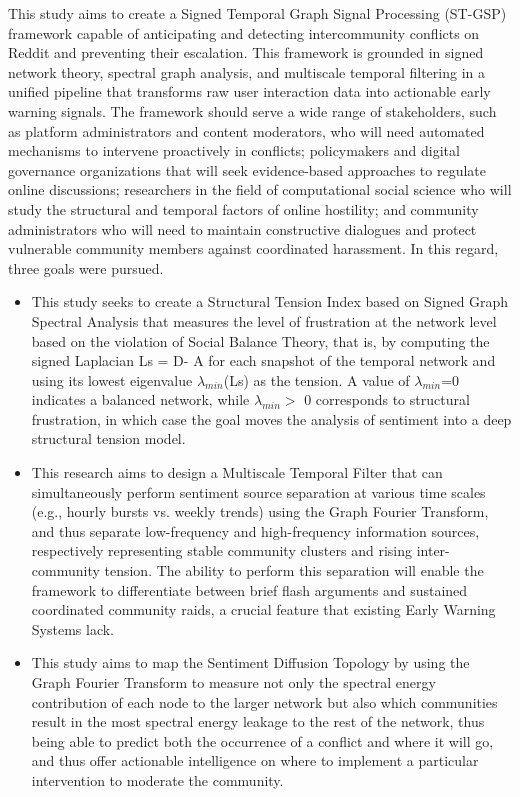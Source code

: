 \documentclass[a4paper,fleqn]{cas-dc}
\begin{document}
This study aims to create a Signed Temporal Graph Signal Processing (ST-GSP) framework capable of anticipating and detecting intercommunity conflicts on Reddit and preventing their escalation. This framework is grounded in signed network theory, spectral graph 
analysis, and multiscale temporal filtering in a unified pipeline that transforms raw user interaction data into actionable early warning signals. The framework should serve a wide range of stakeholders, such as platform administrators and content moderators, who will need automated mechanisms to intervene proactively in conflicts; policymakers and digital governance organizations that will seek evidence-based approaches to regulate online discussions; researchers in the field of computational social science who will study the structural and temporal factors of online hostility; and community administrators who will need to maintain constructive dialogues and protect vulnerable community members against coordinated harassment. In this regard, three goals were pursued. 

\begin{itemize}
    \item This study seeks to create a Structural Tension Index based on Signed Graph Spectral Analysis that measures the level of frustration at the network level based on the violation of Social Balance Theory, that is, by computing the signed Laplacian Ls = D- A for each snapshot of the temporal network and using its lowest eigenvalue  $\lambda_{min}$(Ls) as the tension. A value of $\lambda_{min}$=0 indicates a balanced network, while $\lambda_{min}>$  0 corresponds to structural frustration, in which case the goal moves the analysis of sentiment into a deep structural tension model.

    \item This research aims to design a Multiscale Temporal Filter that can simultaneously perform sentiment source separation at various time scales (e.g., hourly bursts vs. weekly trends) using the Graph Fourier Transform, and thus separate low-frequency and high-frequency information sources, respectively representing stable community clusters and rising inter-community tension. The ability to perform this separation will enable the framework to differentiate between brief flash arguments and sustained coordinated community raids, a crucial feature that existing Early Warning Systems lack.

    \item This study aims to map the Sentiment Diffusion Topology by using the Graph Fourier Transform to measure not only the spectral energy contribution of each node to the larger network but also which communities result in the most spectral energy leakage to the rest of the network, thus being able to predict both the occurrence of a conflict and where it will go, and thus offer actionable intelligence on where to implement a particular intervention to moderate the community.


\end{itemize}
\end{document}

